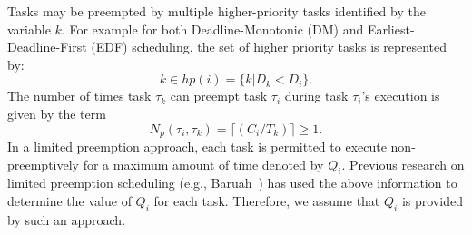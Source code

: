 Tasks may be preempted by multiple higher-priority tasks identified by the variable $k$. For example for both Deadline-Monotonic (DM) and Earliest-Deadline-First (EDF) scheduling, the set of higher priority tasks is represented by:
\begin{equation}\label{eqn:edf-hp-tasks}
    k \in hp(i) = \{k | D_{k} < D_{i}\}.
\end{equation}
\noindent
The number of times task \begin{math}\tau_{k}\end{math} can preempt task \begin{math}\tau_{i}\end{math} during task \begin{math}\tau_{i}\end{math}'s execution is given by the term
\begin{equation}\label{eqn:num-preemptions}
    N_{p}(\tau_{i},\tau_{k})=\lceil(C_{i}/T_{k})\rceil \geq 1.
\end{equation}
\noindent
In a limited preemption approach, each task is permitted to execute non-preemptively for a maximum amount of time denoted by \begin{math}Q_{i}\end{math}.  Previous research on limited preemption scheduling (e.g., Baruah~\cite{baruah:05}) has used the above information to determine the value of $Q_i$ for each task.  Therefore, we assume that $Q_i$ is provided by such an approach.
%

